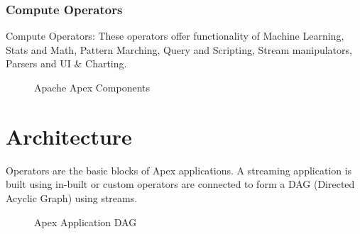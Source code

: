 \documentclass[9pt,twocolumn,twoside]{styles/osajnl}
\begin{document}
\subsubsection{Compute Operators}
Compute Operators: These operators offer functionality of Machine Learning, Stats and Math, Pattern Marching, Query and Scripting, Stream manipulators, Parsers and UI \& Charting.
\begin{figure}[ht!]
\centering
{}
\caption{Apache Apex Components \cite{www-apacheapexblog}}
\label{fig:Apache Apex Components}
\end{figure}




\section{Architecture}

Operators are the basic blocks of Apex applications. A streaming application is built using in-built or custom operators are connected to form a DAG (Directed Acyclic Graph) using streams. 
\begin{figure}[ht!]
\centering
{}
\caption{Apex Application DAG \cite{www-apacheapexappdevdoc}}
\label{fig:Apex Application DAG}
\end{figure}
\end{document}
